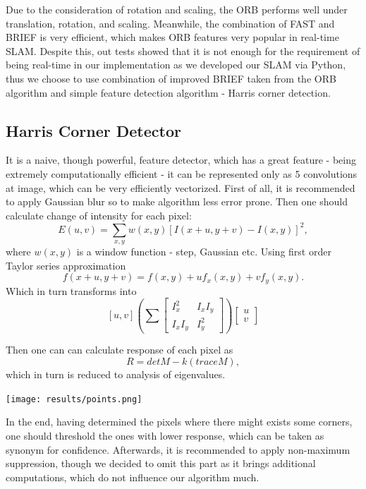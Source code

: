 Due to the consideration of rotation and scaling, the ORB performs well under translation, rotation, and scaling. Meanwhile, the combination of FAST and BRIEF is very efficient, which makes ORB features very popular in real-time SLAM. Despite this, out tests showed that it is not enough for the requirement of being real-time in our implementation as we developed our SLAM via Python, thus we choose to use combination of improved BRIEF taken from the ORB algorithm and simple feature detection algorithm - Harris corner detection.

\subsection{Harris Corner Detector}

It is a naive, though powerful, feature detector, which has a great feature - being extremely computationally efficient - it can be represented only as 5 convolutions at image, which can be very efficiently vectorized. 
First of all, it is recommended to apply Gaussian blur so to make algorithm less error prone. Then one should calculate change of intensity for each pixel: 
$$E(u, v) = \sum_{x, y}w(x, y)[I(x + u, y + v) - I(x, y)]^{2},$$ where $w(x, y)$ is a window function - step, Gaussian etc. Using first order Taylor series approximation $$f(x + u, y + v) = f(x, y) + uf_{x}(x, y) + vf_{y}(x, y).$$ Which in turn transforms into $$ [u, v] (\sum
\begin{bmatrix}
I^{2}_{x} & I_{x} I_{y} \\ I_{x} I_{y} & I^{2}_{y}
\end{bmatrix})
\begin{bmatrix}
u \\ v
\end{bmatrix}
$$

Then one can can calculate response of each pixel as $$R = det M - k(trace M), $$ which in turn is reduced to analysis of eigenvalues.

\begin{center}
    \texttt{[image: results/points.png]}\\[1cm]
\end{center}

In the end, having determined the pixels where there might exists some corners, one should threshold the ones with lower response, which can be taken as synonym for confidence. Afterwards, it is recommended to apply non-maximum suppression, though we decided to omit this part as it brings additional computations, which do not influence our algorithm much.

